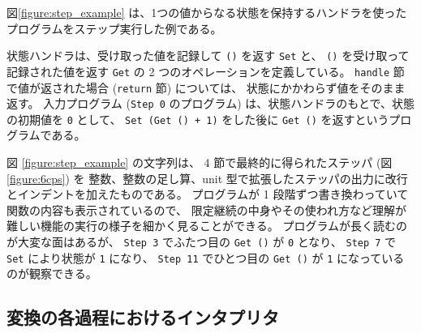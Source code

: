 図\ref{figure:step_example} は、1つの値からなる状態を保持するハンドラを使ったプログラムをステップ実行した例である。

状態ハンドラは、受け取った値を記録して \texttt{()} を返す \texttt{Set} と、
\texttt{()} を受け取って記録された値を返す \texttt{Get} の 2 つのオペレーションを定義している。
\texttt{handle} 節で値が返された場合 (\texttt{return} 節) については、
状態にかかわらず値をそのまま返す。
入力プログラム (\texttt{Step 0} のプログラム) は、状態ハンドラのもとで、状態の初期値を \texttt{0} として、
\texttt{Set (Get () + 1)} をした後に \texttt{Get ()} を返すというプログラムである。

図 \ref{figure:step_example} の文字列は、
4 節で最終的に得られたステッパ (図\ref{figure:6cps}) を
整数、整数の足し算、unit 型で拡張したステッパの出力に改行とインデントを加えたものである。
プログラムが 1 段階ずつ書き換わっていて関数の内容も表示されているので、
限定継続の中身やその使われ方など理解が難しい機能の実行の様子を細かく見ることができる。
プログラムが長く読むのが大変な面はあるが、
\texttt{Step 3} でふたつ目の \texttt{Get ()} が \texttt{0} となり、
\texttt{Step 7} で \texttt{Set} により状態が \texttt{1} になり、
\texttt{Step 11} でひとつ目の \texttt{Get ()} が \texttt{1} になっているのが観察できる。

\newpage

\subsection{変換の各過程におけるインタプリタ}

